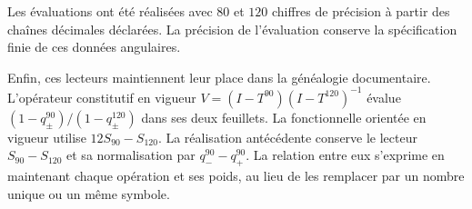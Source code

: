 Les évaluations ont été réalisées avec $80$ et $120$ chiffres de précision à partir
des chaînes décimales déclarées. La précision de l’évaluation conserve
la spécification finie de ces données angulaires.

Enfin, ces lecteurs maintiennent leur place dans la généalogie documentaire.
L’opérateur constitutif en vigueur
$V=(I-T^{90})(I-T^{120})^{-1}$ évalue
$(1-q_\pm^{90})/(1-q_\pm^{120})$ dans ses deux feuillets. La fonctionnelle orientée
en vigueur utilise $12S_{90}-S_{120}$. La réalisation antécédente conserve le lecteur
$S_{90}-S_{120}$ et sa normalisation par $q_-^{90}-q_+^{90}$.
La relation entre eux s’exprime en maintenant chaque opération et ses poids,
au lieu de les remplacer par un nombre unique ou un même symbole.
